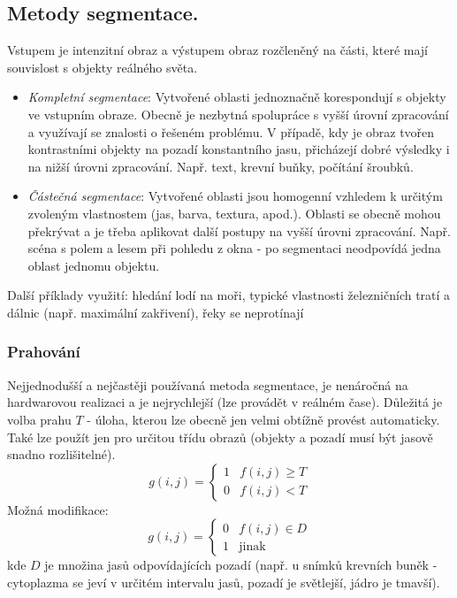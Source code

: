 \subsection{Metody segmentace.}
Vstupem je intenzitní obraz a výstupem obraz rozčleněný na části, které mají souvislost s objekty reálného světa.
\begin{itemize}
\item \textit{Kompletní segmentace}: Vytvořené oblasti jednoznačně korespondují s objekty ve vstupním obraze. Obecně je nezbytná spolupráce s vyšší úrovní zpracování a využívají se znalosti o řešeném problému. V případě, kdy je obraz tvořen kontrastními objekty na pozadí konstantního jasu, přicházejí dobré výsledky i na nižší úrovni zpracování. Např. text, krevní buňky, počítání šroubků.
\item \textit{Částečná segmentace}: Vytvořené oblasti jsou homogenní vzhledem k určitým zvoleným vlastnostem (jas, barva, textura, apod.). Oblasti se obecně mohou překrývat a je třeba aplikovat další postupy na vyšší úrovni zpracování. Např. scéna s polem a lesem při pohledu z okna - po segmentaci neodpovídá jedna oblast jednomu objektu.
\end{itemize}

Další příklady využití: hledání lodí na moři, typické vlastnosti železničních tratí a dálnic (např. maximální zakřivení), řeky se neprotínají

\subsubsection*{Prahování}
Nejjednodušší a nejčastěji používaná metoda segmentace, je nenáročná na hardwarovou realizaci a je nejrychlejší (lze provádět v reálném čase). Důležitá je volba prahu $ T $ - úloha, kterou lze obecně jen velmi obtížně provést automaticky. Také lze použít jen pro určitou třídu obrazů (objekty a pozadí musí být jasově snadno rozlišitelné).
\begin{equation}
g(i,j) = \begin{cases} 1 & f(i,j) \geq T \\ 0 & f(i,j) < T \end{cases}
\end{equation}
Možná modifikace:
\begin{equation}
g(i,j) = \begin{cases} 0 & f(i,j) \in D \\ 1 & \mathrm{jinak} \end{cases}
\end{equation}
kde $ D $ je množina jasů odpovídajících pozadí (např. u snímků krevních buněk - cytoplazma se jeví v určitém intervalu jasů, pozadí je světlejší, jádro je tmavší).


